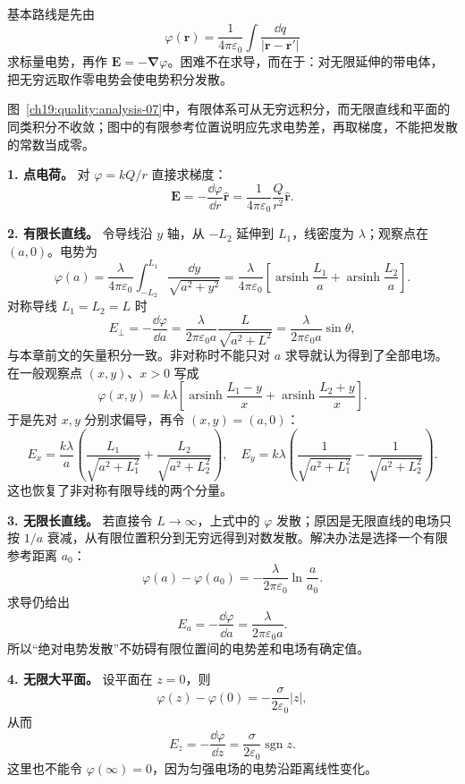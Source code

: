 \begin{xesolution}
基本路线是先由
\[
  \varphi(\boldsymbol r)=\frac{1}{4\pi\varepsilon_0}
  \int\frac{\dd q}{|\boldsymbol r-\boldsymbol r'|}
\]
求标量电势，再作 $\boldsymbol E=-\boldsymbol\nabla\varphi$。困难不在求导，而在于：对无限延伸的带电体，
把无穷远取作零电势会使电势积分发散。

\begin{qualityfigure}
\potentialMethodFigure
{}\label{ch19:quality:analysis-07}
\end{qualityfigure}
图~\ref{ch19:quality:analysis-07}中，有限体系可从无穷远积分，而无限直线和平面的同类积分不收敛；图中的有限参考位置说明应先求电势差，再取梯度，不能把发散的常数当成零。

\textbf{1. 点电荷。} 对 $\varphi=kQ/r$ 直接求梯度：
\[
  \boldsymbol E=-\frac{\dd\varphi}{\dd r}\hat{\boldsymbol r}
  =\boxed{\frac{1}{4\pi\varepsilon_0}\frac{Q}{r^2}\hat{\boldsymbol r}}.
\]

\textbf{2. 有限长直线。} 令导线沿 $y$ 轴，从 $-L_2$ 延伸到 $L_1$，线密度为 $\lambda$；观察点在
$(a,0)$。电势为
\[
  \varphi(a)=\frac{\lambda}{4\pi\varepsilon_0}
  \int_{-L_2}^{L_1}\frac{\dd y}{\sqrt{a^2+y^2}}
  =\frac{\lambda}{4\pi\varepsilon_0}
  \left[\operatorname{arsinh}\frac{L_1}{a}
  +\operatorname{arsinh}\frac{L_2}{a}\right].
\]
对称导线 $L_1=L_2=L$ 时
\[
  E_\perp=-\frac{\dd\varphi}{\dd a}
  =\frac{\lambda}{2\pi\varepsilon_0a}
  \frac{L}{\sqrt{a^2+L^2}}
  =\boxed{\frac{\lambda}{2\pi\varepsilon_0a}\sin\theta},
\]
与本章前文的矢量积分一致。非对称时不能只对 $a$ 求导就认为得到了全部电场。
在一般观察点 $(x,y)$、$x>0$ 写成
\[
 \varphi(x,y)=k\lambda\left[\operatorname{arsinh}\frac{L_1-y}{x}
 +\operatorname{arsinh}\frac{L_2+y}{x}\right].
\]
于是先对 $x,y$ 分别求偏导，再令 $(x,y)=(a,0)$：
\[
 E_x=\frac{k\lambda}{a}\left(\frac{L_1}{\sqrt{a^2+L_1^2}}+
 \frac{L_2}{\sqrt{a^2+L_2^2}}\right),\quad
 E_y=k\lambda\left(\frac1{\sqrt{a^2+L_1^2}}-\frac1{\sqrt{a^2+L_2^2}}\right).
\]
这也恢复了非对称有限导线的两个分量。

\textbf{3. 无限长直线。} 若直接令 $L\to\infty$，上式中的 $\varphi$ 发散；原因是无限直线的电场只按
$1/a$ 衰减，从有限位置积分到无穷远得到对数发散。解决办法是选择一个有限参考距离 $a_0$：
\[
  \boxed{\varphi(a)-\varphi(a_0)
  =-\frac{\lambda}{2\pi\varepsilon_0}\ln\frac{a}{a_0}}.
\]
求导仍给出
\[
  \boxed{E_a=-\frac{\dd\varphi}{\dd a}
  =\frac{\lambda}{2\pi\varepsilon_0a}}.
\]
所以“绝对电势发散”不妨碍有限位置间的电势差和电场有确定值。

\textbf{4. 无限大平面。} 设平面在 $z=0$，则
\[
  \boxed{\varphi(z)-\varphi(0)=-\frac{\sigma}{2\varepsilon_0}|z|},
\]
从而
\[
  \boxed{E_z=-\frac{\dd\varphi}{\dd z}
  =\frac{\sigma}{2\varepsilon_0}\operatorname{sgn}z}.
\]
这里也不能令 $\varphi(\infty)=0$，因为匀强电场的电势沿距离线性变化。


\end{xesolution}
